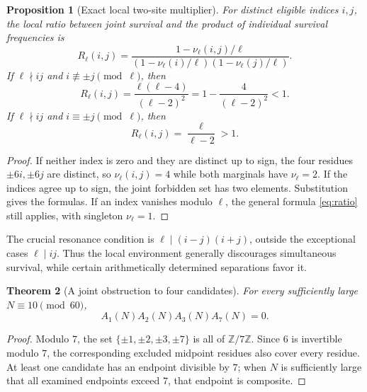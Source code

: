 \documentclass[11pt,a4paper]{article}
\newtheorem{theorem}{Theorem}[section]
\newtheorem{proposition}[theorem]{Proposition}
\theoremstyle{definition}
\newcommand{\ZZ}{\mathbb Z}
\begin{document}
\begin{proposition}[Exact local two-site multiplier]\label{prop:ratio}
For distinct eligible indices $i,j$, the local ratio between joint survival and the product of individual survival frequencies is
\begin{equation}\label{eq:ratio}
 R_\ell(i,j)=\frac{1-\nu_\ell(i,j)/\ell}
 {(1-\nu_\ell(i)/\ell)(1-\nu_\ell(j)/\ell)}.
\end{equation}
If $\ell\nmid ij$ and $i\not\equiv\pm j\pmod\ell$, then
\begin{equation}\label{eq:repulsion}
 R_\ell(i,j)=\frac{\ell(\ell-4)}{(\ell-2)^2}
 =1-\frac4{(\ell-2)^2}<1.
\end{equation}
If $\ell\nmid ij$ and $i\equiv\pm j\pmod\ell$, then
\begin{equation}\label{eq:attraction}
 R_\ell(i,j)=\frac\ell{\ell-2}>1.
\end{equation}
\end{proposition}
\begin{proof}
If neither index is zero and they are distinct up to sign, the four residues $\pm6i,\pm6j$ are distinct, so $\nu_\ell(i,j)=4$ while both marginals have $\nu_\ell=2$.  If the indices agree up to sign, the joint forbidden set has two elements.  Substitution gives the formulas.  If an index vanishes modulo $\ell$, the general formula \eqref{eq:ratio} still applies, with singleton $\nu_\ell=1$.
\end{proof}

The crucial resonance condition is $\ell\mid(i-j)(i+j)$, outside the exceptional cases $\ell\mid ij$.  Thus the local environment generally discourages simultaneous survival, while certain arithmetically determined separations favor it.

\begin{theorem}[A joint obstruction to four candidates]\label{thm:four}
For every sufficiently large $N\equiv10\pmod{60}$,
\begin{equation}\label{eq:forbiddenfour}
 A_1(N)A_2(N)A_3(N)A_7(N)=0.
\end{equation}
\end{theorem}
\begin{proof}
Modulo $7$, the set $\{\pm1,\pm2,\pm3,\pm7\}$ is all of $\ZZ/7\ZZ$. Since $6$ is invertible modulo $7$, the corresponding excluded midpoint residues also cover every residue. At least one candidate has an endpoint divisible by $7$; when $N$ is sufficiently large that all examined endpoints exceed $7$, that endpoint is composite.
\end{proof}
\end{document}
